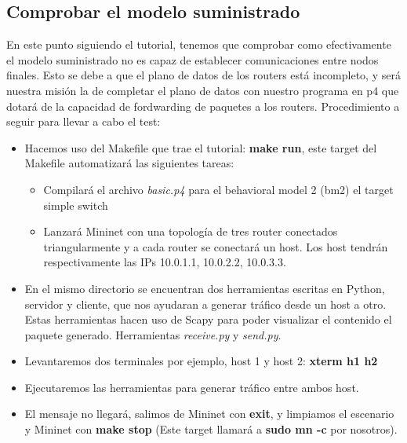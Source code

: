 \subsection{Comprobar el modelo suministrado}
En este punto siguiendo el tutorial, tenemos que comprobar como efectivamente el modelo suministrado no es capaz de establecer comunicaciones entre nodos finales. Esto se debe a que el plano de datos de los routers está incompleto, y será nuestra misión la de completar el plano de datos con nuestro programa en p4 que dotará de la capacidad de fordwarding de paquetes a los routers. \newline
\newline
Procedimiento a seguir para llevar a cabo el test:
\begin{itemize}
    \item Hacemos uso del Makefile que trae el tutorial: \textbf{make run}, este target del Makefile automatizará las siguientes tareas:
    \begin{itemize}
        \item Compilará el archivo \textit{basic.p4} para el behavioral model 2 (bm2) el target simple switch
        \item Lanzará Mininet con una topología de tres router conectados triangularmente y a cada router se conectará un host. Los host tendrán respectivamente las IPs 10.0.1.1, 10.0.2.2, 10.0.3.3. 
    \end{itemize}
    \item En el mismo directorio se encuentran dos herramientas escritas en Python, servidor y cliente, que nos ayudaran a generar tráfico desde un host a otro. Estas herramientas hacen uso de Scapy para poder visualizar el contenido el paquete generado. Herramientas \textit{receive.py} y \textit{send.py}. 
    \item Levantaremos dos terminales por ejemplo, host 1 y host 2: \textbf{xterm h1 h2}
    \item Ejecutaremos las herramientas para generar tráfico entre ambos host.
    \item El mensaje no llegará, salimos de Mininet con \textbf{exit}, y limpiamos el escenario y Mininet con \textbf{make stop} (Este target llamará a \textbf{sudo mn -c} por nosotros).
\end{itemize}


